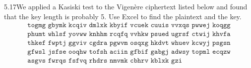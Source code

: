 \begin{exercise}
    {5.17}We applied a Kasiski test to the Vigen\`ere ciphertext listed below and found that the key length is probably 5. Use Excel to find the plaintext and the key.
    \[\begin{array}{l}
            \texttt{togmg \ gbymk \ kcqiv \ dmlxk \ kbyif \ vcuek \ cuuis \ vvxqs \ pwwej \ koqgg} \\
            \texttt{phumt \ whlsf \ yovww \ knhhm \ rcqfq \ vvhkw \ psued \ ugrsf \ ctwij \ khvfa} \\
            \texttt{thkef \ fwptj \ ggviv \ cgdra \ pgwvm \ osqxg \ hkdvt \ whuev \ kcwyj \ psgsn} \\
            \texttt{gfwsl \ jsfse \ ooqhw \ tofsh \ aciin \ gfbif \ gabgj \ adwsy \ topml \ ecqzw} \\
            \texttt{asgvs \ fwrqs \ fsfvq \ rhdrs \ nmvmk \ cbhrv \ kblxk \ gzi}                   \\
        \end{array}\]
\end{exercise}


